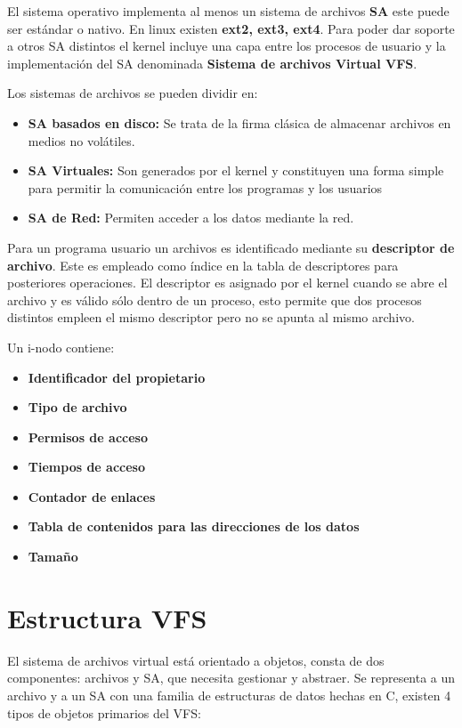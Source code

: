 El sistema operativo implementa al menos un sistema de archivos \textbf{SA} este puede ser estándar o nativo. En linux existen \textbf{ext2, ext3, ext4}. Para poder dar soporte a otros SA distintos el kernel incluye una capa entre los procesos de usuario y la implementación del SA denominada \textbf{Sistema de archivos Virtual VFS}.

Los sistemas de archivos se pueden dividir en:

\begin{itemize}
	\item\textbf{SA basados en disco:} Se trata de la firma clásica de almacenar archivos en medios no volátiles.
	\item\textbf{SA Virtuales:} Son generados por el kernel y constituyen una forma simple para permitir la comunicación entre los programas y los usuarios
	\item\textbf{SA de Red:} Permiten acceder a los datos mediante la red.
\end{itemize}

Para un programa usuario un archivos es identificado mediante su \textbf{descriptor de archivo}. Este es empleado como índice en la tabla de descriptores para posteriores operaciones. El descriptor es asignado por el kernel cuando se abre el archivo y es válido sólo dentro de un proceso, esto permite que dos procesos distintos empleen el mismo descriptor pero no se apunta al mismo archivo.

Un i-nodo contiene:

\begin{itemize}
	\item\textbf{Identificador del propietario}
	\item\textbf{Tipo de archivo}
	\item\textbf{Permisos de acceso}
	\item\textbf{Tiempos de acceso}
	\item\textbf{Contador de enlaces}
	\item\textbf{Tabla de contenidos para las direcciones de los datos}
	\item\textbf{Tamaño}
\end{itemize}

\section*{Estructura VFS}
El sistema de archivos virtual está orientado a objetos, consta de dos componentes: archivos y SA, que necesita gestionar y abstraer. Se representa a un archivo y a un SA con una familia de estructuras de datos hechas en C, existen 4 tipos de objetos primarios del VFS:

